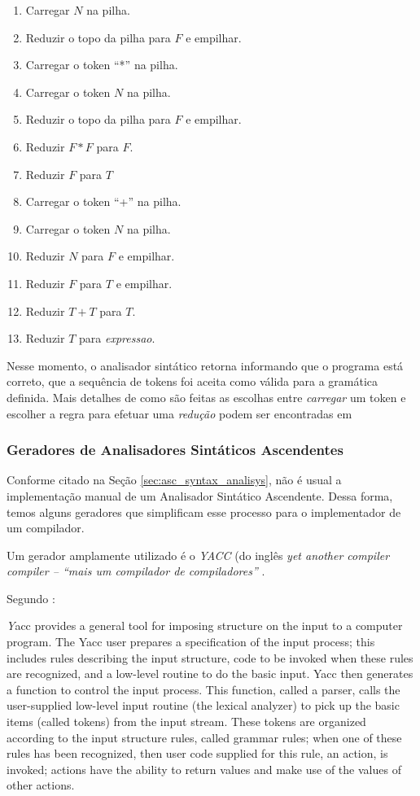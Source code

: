 \begin{enumerate}
  \item Carregar $N$ na pilha.
  \item Reduzir o topo da pilha para $F$ e empilhar.
  \item Carregar o token ``*'' na pilha.
  \item Carregar o token $N$ na pilha.
  \item Reduzir o topo da pilha para $F$ e empilhar.
  \item Reduzir $F*F$ para $F$.
	\item Reduzir $F$ para $T$
  \item Carregar o token ``+'' na pilha.
  \item Carregar o token $N$ na pilha.
  \item Reduzir $N$ para $F$ e empilhar.
  \item Reduzir $F$ para $T$ e empilhar.
  \item Reduzir $T+T$ para $T$.
	\item Reduzir $T$ para \emph{expressao}.
\end{enumerate}

Nesse momento, o analisador sintático retorna informando que o programa está
correto, que a sequência de tokens foi aceita como válida para a gramática
definida. Mais detalhes de como são feitas as escolhas entre \emph{carregar} um token
e escolher a regra para efetuar uma \emph{redução} podem ser encontradas em

\subsubsection{Geradores de Analisadores Sintáticos Ascendentes}
\label{sec:yacc}

Conforme citado na Seção \ref{sec:asc_syntax_analisys}, não é usual a
implementação manual de um Analisador Sintático Ascendente. Dessa forma, temos
alguns geradores que simplificam esse processo para o implementador de um
compilador.

Um gerador amplamente utilizado é o \emph{YACC} (do inglês \emph{yet another
compiler compiler {--} ``mais um compilador de compiladores''}
\cite{louden97-pt}.

Segundo :

\begin{citacao}{4cm}{0cm} \footnotesize \emph
Yacc provides a general tool for imposing structure on the input to a computer
program. The Yacc user prepares a specification of the input process; this
includes rules describing the input structure, code to be invoked when these
rules are recognized, and a low-level routine to do the basic input. Yacc then
generates a function to control the input process. This function, called a
parser, calls the user-supplied low-level input routine (the lexical analyzer)
to pick up the basic items (called tokens) from the input stream. These tokens
are organized according to the input structure rules, called grammar rules;
when one of these rules has been recognized, then user code supplied for this
rule, an action, is invoked; actions have the ability to return values and
make use of the values of other actions.
\end{citacao}

